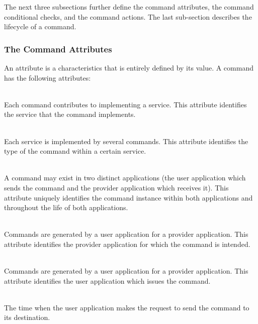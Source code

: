 The next three subsections further define the command attributes, the command conditional checks, and the command actions. The last sub-section describes the lifecycle of a command. 

\subsubsection{The Command Attributes}\label{sec:CmdAttributes}

An attribute is a characteristics that is entirely defined by its value. 
A command has the following attributes:

\begin{fw_description}
\item[Service Type]\hfill\\
Each command contributes to implementing a service. This attribute identifies the service that the command implements. 

\item[Command Sub-Type]\hfill\\
Each service is implemented by several commands. 
This attribute identifies the type of the command within a certain service. 

\item[Command Identifier]\hfill\\
A command may exist in two distinct applications (the user application which sends the command and the provider application which receives it). This attribute uniquely identifies the command instance within both applications and throughout the life of both applications.

\item[Destination]\hfill\\
Commands are generated by a user application for a provider application. This attribute identifies the provider application for which the command is intended.

\item[Source]\hfill\\
Commands are generated by a user application for a provider application. This attribute identifies the user application which issues the command.

\item[Time Stamp]\hfill\\
The time when the user application makes the request to send the command to its destination. 


\end{fw_description}
